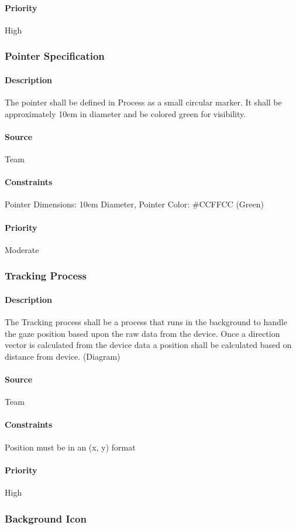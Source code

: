 \paragraph{Priority}
High
\subsubsection{Pointer Specification}
\paragraph{Description}
The pointer shall be defined in Process as a small circular marker.  It shall be approximately 10em in diameter and be colored green for visibility.
\paragraph{Source}
Team
\paragraph{Constraints}
Pointer Dimensions: 10em Diameter, Pointer Color: \#CCFFCC (Green)
\paragraph{Priority}
Moderate
\subsubsection{Tracking Process}
\paragraph{Description}
The Tracking process shall be a process that runs in the background to handle the gaze position based upon the raw data from the device.  Once a direction vector is calculated from the device data a position shall be calculated based on distance from device. (Diagram)
\paragraph{Source}
Team
\paragraph{Constraints}
Position must be in an (x, y) format
\paragraph{Priority}
High
\subsubsection{Background Icon}
